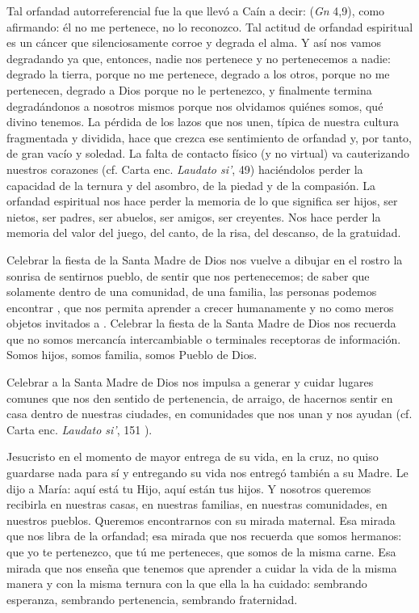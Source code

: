 \begin{body}
	Tal orfandad autorreferencial fue la que llevó a Caín a decir:  (\emph{Gn} 4,9), como afirmando: él no me pertenece, no lo reconozco. Tal actitud de orfandad espiritual es un cáncer que silenciosamente corroe y degrada el alma. Y así nos vamos degradando ya que, entonces, nadie nos pertenece y no pertenecemos a nadie: degrado la tierra, porque no me pertenece, degrado a los otros, porque no me pertenecen, degrado a Dios porque no le pertenezco, y finalmente termina degradándonos a nosotros mismos porque nos olvidamos quiénes somos, qué  divino tenemos. La pérdida de los lazos que nos unen, típica de nuestra cultura fragmentada y dividida, hace que crezca ese sentimiento de orfandad y, por tanto, de gran vacío y soledad. La falta de contacto físico (y no virtual) va cauterizando nuestros corazones (cf. Carta enc. \emph{Laudato si'}, 49) haciéndolos perder la capacidad de la ternura y del asombro, de la piedad y de la compasión. La orfandad espiritual nos hace perder la memoria de lo que significa ser hijos, ser nietos, ser padres, ser abuelos, ser amigos, ser creyentes. Nos hace perder la memoria del valor del juego, del canto, de la risa, del descanso, de la gratuidad.
	
	Celebrar la fiesta de la Santa Madre de Dios nos vuelve a dibujar en el rostro la sonrisa de sentirnos pueblo, de sentir que nos pertenecemos; de saber que solamente dentro de una comunidad, de una familia, las personas podemos encontrar ,  que nos permita aprender a crecer humanamente y no como meros objetos invitados a . Celebrar la fiesta de la Santa Madre de Dios nos recuerda que no somos mercancía intercambiable o terminales receptoras de información. Somos hijos, somos familia, somos Pueblo de Dios.
	
	Celebrar a la Santa Madre de Dios nos impulsa a generar y cuidar lugares comunes que nos den sentido de pertenencia, de arraigo, de hacernos sentir en casa dentro de nuestras ciudades, en comunidades que nos unan y nos ayudan (cf. Carta enc. \emph{Laudato si'}, 151 ).
	
	Jesucristo en el momento de mayor entrega de su vida, en la cruz, no quiso guardarse nada para sí y entregando su vida nos entregó también a su Madre. Le dijo a María: aquí está tu Hijo, aquí están tus hijos. Y nosotros queremos recibirla en nuestras casas, en nuestras familias, en nuestras comunidades, en nuestros pueblos. Queremos encontrarnos con su mirada maternal. Esa mirada que nos libra de la orfandad; esa mirada que nos recuerda que somos hermanos: que yo te pertenezco, que tú me perteneces, que somos de la misma carne. Esa mirada que nos enseña que tenemos que aprender a cuidar la vida de la misma manera y con la misma ternura con la que ella la ha cuidado: sembrando esperanza, sembrando pertenencia, sembrando fraternidad.
	

\end{body}
